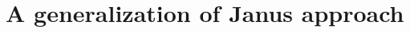 \documentclass{beamer}
\begin{document}
\section{\FONDFOR}

\section{A generalization of Janus approach}
%
%
%
%
%
%
%
%
%
%
%
%
%
\end{document}
